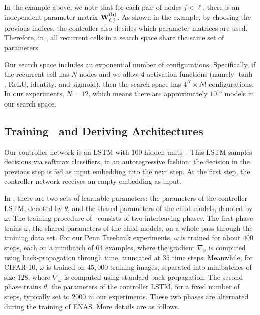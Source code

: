 In the example above, we note that for each pair of nodes $j < \ell$, there is an independent parameter matrix $\mathbf{W}^{(\mathbf{h})}_{\ell, j}$. As shown in the example, by choosing the previous indices, the controller also decides which parameter matrices are used. Therefore, in \enas, all recurrent cells in a search space share the same set of parameters.

Our search space includes an exponential number of configurations. Specifically, if the recurrent cell has $N$ nodes and we allow $4$ activation functions (namely $\tanh$, $\text{ReLU}$, $\text{identity}$, and $\text{sigmoid}$), then the search space has $4^{N} \times N!$ configurations. In our experiments, $N = 12$, which means there are approximately $10^{15}$ models in our search space.

\subsection{\label{sec:model_policy}Training \enas~and Deriving Architectures}
Our controller network is an LSTM with $100$ hidden units~\citep{lstm}. This LSTM samples decisions via softmax classifiers, in an autoregressive fashion: the decision in the previous step is fed as input embedding into the next step. At the first step, the controller network receives an empty embedding as input.

In \enas, there are two sets of learnable parameters: the parameters of the controller LSTM, denoted by $\theta$, and the shared parameters of the child models, denoted by $\omega$. The training procedure of \enas~consists of two interleaving phases. The first phase trains $\omega$, the shared parameters of the child models, on a whole pass through the training data set. For our Penn Treebank experiments, $\omega$ is trained for about $400$ steps, each on a minibatch of $64$ examples, where the gradient $\nabla_\omega$ is computed using back-propagation through time, truncated at $35$ time steps. Meanwhile, for CIFAR-10, $\omega$ is trained on $45,000$ training images, separated into minibatches of size $128$, where $\nabla_\omega$ is computed using standard back-propagation. The second phase trains $\theta$, the parameters of the controller LSTM, for a fixed number of steps, typically set to $2000$ in our experiments. These two phases are alternated during the training of ENAS. More details are as follows.

